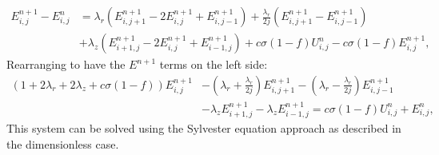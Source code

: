 \documentclass{article}
\begin{document}
\begin{equation}
\begin{split}
E^{n+1}_{i,j}-E^{n}_{i,j} & = \lambda_{r}(E^{n+1}_{i,j+1}-2E^{n+1}_{i,j}+E^{n+1}_{i,j-1}) 
 + \frac{\lambda_r}{2j}(E^{n+1}_{i,j+1}-E^{n+1}_{i,j-1}) \\
& + \lambda_z({E^{n+1}_{i+1,j}-2E^{n+1}_{i,j}+E^{n+1}_{i-1,j}}) + c\sigma (1-f) U^{n}_{i,j} - c \sigma (1-f) E^{n+1}_{i,j},
\end{split}
\end{equation}
Rearranging to have the $E^{n+1}$ terms on the left side:
\begin{equation}    
\begin{split}
(1 + 2\lambda_{r} + 2\lambda_z + c\sigma (1-f))E^{n+1}_{i,j} & - (\lambda_{r} + \frac{\lambda_{r}}{2j})E^{n+1}_{i,j+1} 
- (\lambda_{r} - \frac{\lambda_{r}}{2j})E^{n+1}_{i,j-1} \\
& - \lambda_z E^{n+1}_{i+1,j} - \lambda_z E^{n+1}_{i-1,j} = c\sigma (1-f) U^{n}_{i,j} + E^{n}_{i,j},
\end{split}
\end{equation}
This system can be solved using the Sylvester equation approach as described in the dimensionless case.
\end{document}
